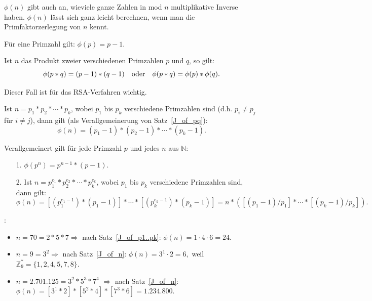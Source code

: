 \begin{refsegment}
$\phi(n)$ gibt auch an, wieviele ganze Zahlen in mod $n$ multiplikative Inverse
haben. $\phi(n)$ lässt sich ganz leicht berechnen, wenn man die Primfaktorzerlegung
 von $n$ kennt.

\begin{satz}\label{thm-zth-phiprime}
Für eine Primzahl gilt: $\phi(p) = p - 1.$
\end{satz}

\begin{satz}\label{thm-zth-phipq} \label{J_of_pq}
Ist $n$ das Produkt zweier verschiedenen Primzahlen $p$ und $q$, so gilt:
$$\phi(p*q) = (p - 1) * (q - 1) \quad {\rm oder} \quad \phi(p * q) = \phi(p) * \phi(q).$$
\end{satz}
\noindent Dieser Fall ist für das RSA-Verfahren wichtig.

\begin{satz}\label{thm-zth-phimultprime} \label{J_of_p1..pk}
Ist $n = p_1 * p_2 * \cdots * p_k$, wobei $p_1$ bis $p_k$ verschiedene
Primzahlen sind (d.h. $p_i \not= p_j$ für $i \not= j$), dann gilt (als
Verallgemeinerung von Satz~\ref{J_of_pq}):
$$\phi(n) = (p_1 - 1)*(p_2 - 1)* \cdots *(p_k - 1).$$
\end{satz}


\begin{satz}\label{thm-zth-phinum} \label{J_of_n}

Verallgemeinert gilt für jede Primzahl $p$ und jedes $n$ aus $\mathbb{N}$:
\begin{itemize}
 \item[1.] $\phi(p^n) = p^{n-1} * (p-1)$.
 \item[2.] Ist $n = p_1^{e_1} * p_2^{e_2} * \cdots *p_k^{e_k}$,
           wobei $p_1$ bis $p_k$ verschiedene Primzahlen sind, dann gilt:
           $$\phi(n) = [(p_1^{e_1-1}) * (p_1-1)] * \cdots * [(p_k^{e_k-1})*(p_k - 1)] = n * ([(p_1-1) / p_1] * \cdots * [(p_k-1) / p_k]).$$
\end{itemize}
\end{satz}


\pagebreak  %
\begin{example}{:}
\begin{itemize}
\item  $n=70=2*5*7 \Longrightarrow $ nach Satz~\ref{J_of_p1..pk}: $ \phi(n)= 1\cdot 4 \cdot 6 =24.$
\item  $n=9=3^2 \Longrightarrow$ nach Satz~\ref{J_of_n}: $ \phi(n)= 3^1\cdot 2 =6,$ weil  $\mathbb{Z}_9^* =\{ 1,2,4,5,7,8\}.$
\item $n = 2.701.125 = 3^2 * 5^3 * 7^4$ $\Longrightarrow$ nach Satz~\ref{J_of_n}:
$\phi(n) = [3^1 * 2] * [5^2 * 4] * [7^3 * 6] = 1.234.800.$
\end{itemize}
\end{example}




\end{refsegment}
